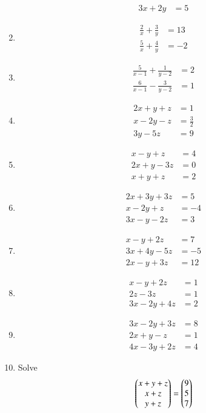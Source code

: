 \begin{multicols}{2}
\begin{enumerate}[label=\thesubsection.\arabic*,ref=\thesubsection.\theenumi]
\begin{align*}
 3x+2y &= 5
\end{align*}
\item 
\begin{align*}
\frac{2}{x}+\frac{3}{y}&= 13 \\ \frac{5}{x}+\frac{4}{y} &= -2
\end{align*}
\item 
\begin{align*}
\frac{5}{x-1}+\frac{1}{y-2}&= 2 \\ \frac{6}{x-1}-\frac{3}{y-2}&= 1
\end{align*}
\item
\begin{align*}
 2x+y+z &= 1\\
 x-2y-z &= \frac{3}{2} \\
 3y-5z &= 9
\end{align*}
\item
\begin{align*}
 x-y+z &= 4\\
 2x+y-3z &= 0\\
 x+y+z &= 2
\end{align*}
\item
\begin{align*}
 2x+3y+3z &= 5\\
 x-2y+z &= -4\\
 3x-y-2z &= 3
\end{align*}
\item   \label{prob:14}
\begin{align*}
 x-y+2z &= 7\\
 3x+4y-5z &= -5\\
 2x-y+3z &= 12
\end{align*}
\item  
\begin{align*}
x-y+2z&=1\\ 2z-3z&=1\\ 3x-2y+4z&=2
\end{align*}
\item 
\begin{align*}
3x-2y+3z&=8\\ 2x+y-z&=1\\ 4x-3y+2z&=4
\end{align*}
\item Solve
\begin{align*}
\begin{pmatrix}x+y+z \\ x+z \\ y+z \end{pmatrix}=
\begin{pmatrix}9 \\ 5 \\  7\end{pmatrix}
\end{align*}

\end{enumerate}
\end{multicols}
